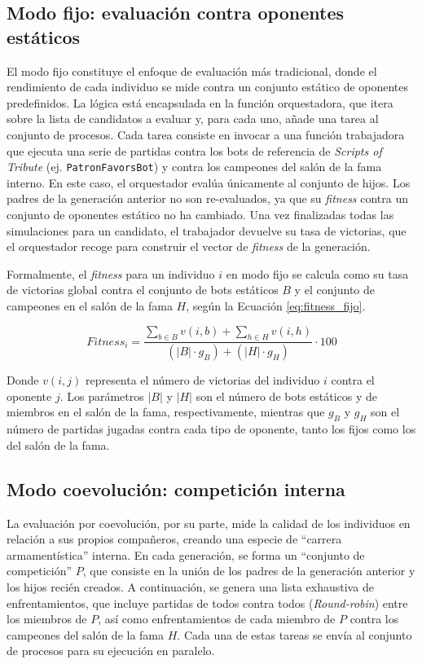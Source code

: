 \subsection{Modo fijo: evaluación contra oponentes estáticos} \label{sec:modo_fijo_evaluacion}

El modo fijo constituye el enfoque de evaluación más tradicional, donde el rendimiento de cada individuo se mide contra un conjunto estático de oponentes predefinidos. La lógica está encapsulada en la función orquestadora, que itera sobre la lista de candidatos a evaluar y, para cada uno, añade una tarea al conjunto de procesos. Cada tarea consiste en invocar a una función trabajadora que ejecuta una serie de partidas contra los bots de referencia de \textit{Scripts of Tribute} (ej. \texttt{PatronFavorsBot}) y contra los campeones del salón de la fama interno. En este caso, el orquestador evalúa únicamente al conjunto de hijos. Los padres de la generación anterior no son re-evaluados, ya que su \textit{fitness} contra un conjunto de oponentes estático no ha cambiado. Una vez finalizadas todas las simulaciones para un candidato, el trabajador devuelve su tasa de victorias, que el orquestador recoge para construir el vector de \textit{fitness} de la generación.

Formalmente, el \textit{fitness} para un individuo $i$ en modo fijo se calcula como su tasa de victorias global contra el conjunto de bots estáticos $B$ y el conjunto de campeones en el salón de la fama $H$, según la Ecuación \ref{eq:fitness_fijo}.

\begin{equation}
	\textit{Fitness}_{i} = \frac{\sum_{b \in B} v(i, b) + \sum_{h \in H} v(i, h)}{(|B| \cdot g_B) + (|H| \cdot g_H)} \cdot 100
	\label{eq:fitness_fijo}
\end{equation}

Donde $v(i, j)$ representa el número de victorias del individuo $i$ contra el oponente $j$. Los parámetros $|B|$ y $|H|$ son el número de bots estáticos y de miembros en el salón de la fama, respectivamente, mientras que $g_B$ y $g_H$ son el número de partidas jugadas contra cada tipo de oponente, tanto los fijos como los del salón de la fama.

\subsection{Modo coevolución: competición interna} \label{sec:modo_coevolucion_competicion}

La evaluación por coevolución, por su parte, mide la calidad de los individuos en relación a sus propios compañeros, creando una especie de ``carrera armamentística'' interna. En cada generación, se forma un ``conjunto de competición'' $P$, que consiste en la unión de los padres de la generación anterior y los hijos recién creados. A continuación, se genera una lista exhaustiva de enfrentamientos, que incluye partidas de todos contra todos (\textit{Round-robin}) entre los miembros de $P$, así como enfrentamientos de cada miembro de $P$ contra los campeones del salón de la fama $H$. Cada una de estas tareas se envía al conjunto de procesos para su ejecución en paralelo.

